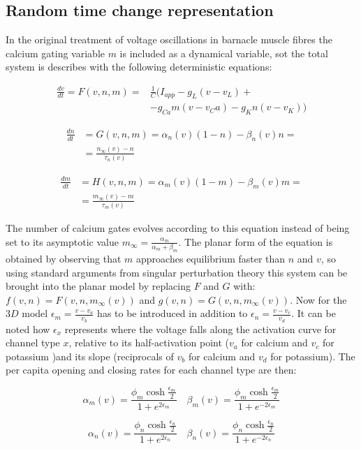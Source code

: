 	\subsection{Random time change representation}
	In the original treatment of voltage oscillations  in barnacle muscle fibres the calcium gating variable $m$ is included as a dynamical variable, sot the total system is describes with the following deterministic equations:


	\begin{align*}
		\frac{dv}{dt} = F(v, n, m) =&\frac{1}{C}(I_{app}-g_L(v-v_L)+\\
																&-g_{Ca}m(v-v_Ca)-g_Kn(v-v_K))
	\end{align*}

	\begin{align*}
		\frac{dn}{dt} &= G(v, n, m) = \alpha_n(v)(1-n)-\beta_n(v)n=\\
									&=\frac{n_{\infty}(v)-n}{\tau_n(v)}
	\end{align*}

	\begin{align*}
		\frac{dm}{dt} &= H(v, n, m) = \alpha_m(v)(1-m)-\beta_m(v)m=\\
									&=\frac{m_\infty(v)-m}{\tau_m(v)}
	\end{align*}

	The number of calcium gates evolves according to this equation instead of being set to its asymptotic value $m_\infty = \frac{\alpha_m}{\alpha_m+\beta_m}$.
	The planar form of the equation is obtained by observing that $m$ approaches equilibrium faster than $n$ and $v$, so using standard arguments from singular perturbation theory this system can be brought into the planar model by replacing $F$ and $G$ with: $f(v, n) = F(v, n, m_\infty(v))$ and $g(v, n) = G(v, n, m_\infty(v))$.
	Now for the $3D$ model $\epsilon_m = \frac{v-v_a}{v_b}$ has to be introduced in addition to $\epsilon_n = \frac{v-v_c}{v_d}$.
	It can be noted how $\epsilon_x$ represents where the voltage falls along the activation curve for channel type $x$, relative to its half-activation point ($v_a$ for calcium and $v_c$ for potassium )and its slope (reciprocals of $v_b$ for calcium and $v_d$ for potassium).
	The per capita opening and closing rates for each channel type are then:

	$$\alpha_m(v) = \frac{\phi_m\cosh\frac{\epsilon_m}{2}}{1+e^{2\epsilon_m}}\quad\beta_m(v) = \frac{\phi_m\cosh\frac{\epsilon_m}{2}}{1+e^{-2\epsilon_m}}$$

	$$\alpha_n(v) = \frac{\phi_n\cosh\frac{\epsilon_n}{2}}{1+e^{2\epsilon_n}}\quad\beta_n(v) = \frac{\phi_n\cosh\frac{\epsilon_n}{2}}{1+e^{-2\epsilon_n}}$$

